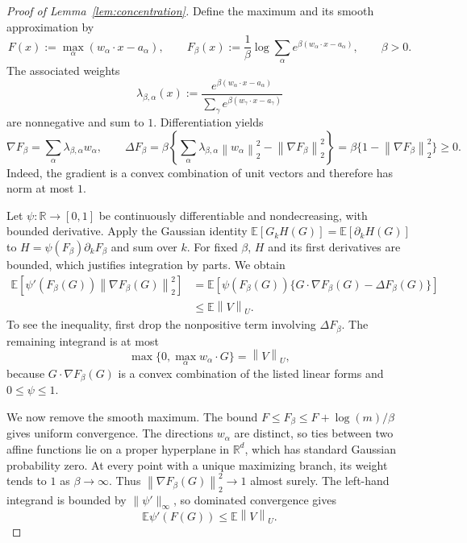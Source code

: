 \documentclass[11pt,letterpaper]{article}
\theoremstyle{remark}
\newcommand{\E}{\mathbb E}
\newcommand{\R}{\mathbb R}
\newcommand{\norm}[1]{\left\lVert#1\right\rVert}
\begin{document}
\begin{proof}[Proof of Lemma~\ref{lem:concentration}]
Define the maximum and its smooth approximation by
\[
 F(x):=\max_\alpha(w_\alpha\cdot x-a_\alpha),\qquad
 F_\beta(x):=\frac1\beta\log\sum_\alpha
          e^{\beta(w_\alpha\cdot x-a_\alpha)},\qquad\beta>0.
\]
The associated weights
\[
 \lambda_{\beta,\alpha}(x):=
 \frac{e^{\beta(w_\alpha\cdot x-a_\alpha)}}
      {\sum_\gamma e^{\beta(w_\gamma\cdot x-a_\gamma)}}
\]
are nonnegative and sum to $1$. Differentiation yields
\[
 \nabla F_\beta=\sum_\alpha\lambda_{\beta,\alpha}w_\alpha,
 \qquad
 \Delta F_\beta
 =\beta\left\{\sum_\alpha\lambda_{\beta,\alpha}
                       \norm{w_\alpha}_2^2
                     -\norm{\nabla F_\beta}_2^2\right\}
 =\beta\{1-\norm{\nabla F_\beta}_2^2\}\ge0.
\]
Indeed, the gradient is a convex combination of unit vectors and
therefore has norm at most $1$.

Let $\psi:\R\to[0,1]$ be continuously differentiable and
nondecreasing, with bounded derivative. Apply the Gaussian identity
$\E[G_kH(G)]=\E[\partial_kH(G)]$ to
$H=\psi(F_\beta)\partial_kF_\beta$ and sum over $k$.
For fixed $\beta$, $H$ and its first derivatives are bounded,
which justifies integration by parts. We obtain
\[
 \begin{aligned}
 \E[\psi'(F_\beta(G))\norm{\nabla F_\beta(G)}_2^2]
 &=\E[\psi(F_\beta(G))
       \{G\cdot\nabla F_\beta(G)-\Delta F_\beta(G)\}]\\
 &\le\E\norm V_U.
 \end{aligned}
\]
To see the inequality, first drop the nonpositive term involving
$\Delta F_\beta$. The remaining integrand is at most
\[
 \max\{0,\max_\alpha w_\alpha\cdot G\}=\norm V_U,
\]
because $G\cdot\nabla F_\beta(G)$ is a convex combination of the
listed linear forms and $0\le\psi\le1$.

We now remove the smooth maximum. The bound
$F\le F_\beta\le F+\log(m)/\beta$ gives uniform convergence.
The directions $w_\alpha$ are distinct, so ties between two affine
functions lie on a proper hyperplane in $\R^d$, which has standard
Gaussian probability zero. At every point with a unique maximizing
branch, its weight tends to $1$ as $\beta\to\infty$.
Thus $\norm{\nabla F_\beta(G)}_2^2\to1$ almost surely.
The left-hand integrand is bounded by $\|\psi'\|_\infty$,
so dominated convergence gives
\[
 \E\psi'(F(G))\le\E\norm V_U.
\]


\end{proof}
\end{document}
